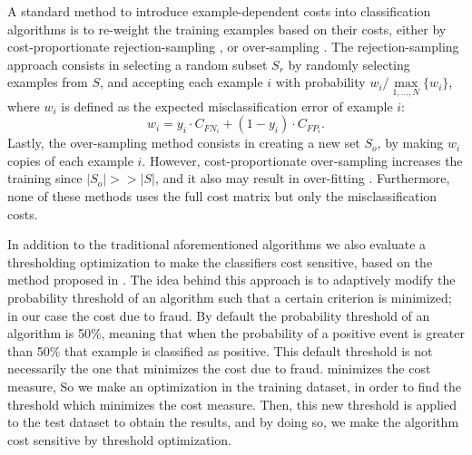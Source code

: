 	  A standard method to introduce example-dependent costs into classification algorithms is to 
		re-weight the training examples based on their costs, either by cost-proportionate 
		rejection-sampling \citep{Zadrozny2003}, or over-sampling \citep{Elkan2001}. The 
		rejection-sampling approach consists in selecting a random subset $S_{r}$  by randomly 
		selecting examples from $S$, and accepting each example $i$ with probability $w_i/ 
		\max\limits_{1,\dots, N}\{w_i\}$, where $w_i$ is defined as the expected misclassification 
		error of example $i$:
    \begin{equation}\label{eq_pred1}
      w_i = y_i\cdot C_{FN_i}+(1-y_i)\cdot C_{FP_i}.
    \end{equation}
	  Lastly, the over-sampling method consists in creating a new set $S_{o}$, by making $w_i$ 
		copies of each example $i$. However, cost-proportionate over-sampling increases the training 
		since $\vert S_{o}\vert >> \vert S \vert$, and it also may result in over-fitting 
		\citep{Drummond2003}. Furthermore, none of these methods uses the full cost matrix but only the 
		misclassification costs.

In addition to the traditional aforementioned algorithms we also evaluate a thresholding 
optimization to make the 
   classifiers cost sensitive, based on the method proposed in \cite{Sheng2006}.
   The idea behind this approach is to adaptively modify the probability threshold of an 
   algorithm such that a certain criterion is minimized; in our case the cost due to fraud.
   By default the probability threshold of an algorithm is 50\%, meaning that when the probability 
   of a positive event is greater than 50\% that example is classified as positive.
   This default threshold is not necessarily the one that minimizes the cost due to fraud. 
minimizes the cost measure,
   So we make an optimization in the training dataset, in order to find the threshold which 
minimizes the cost measure.
   Then, this new threshold is applied to the test dataset to obtain the results,
   and by doing so, we make the algorithm cost sensitive by threshold optimization.